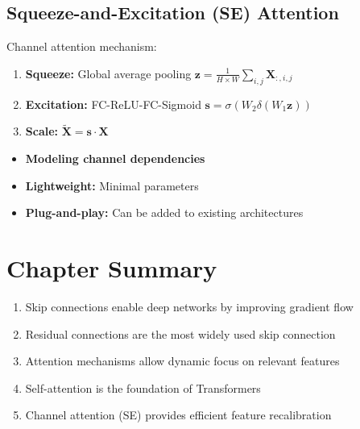 \subsection{Squeeze-and-Excitation (SE) Attention}

Channel attention mechanism:
\begin{enumerate}
    \item \textbf{Squeeze:} Global average pooling $\mathbf{z} = \frac{1}{H\times W}\sum_{i,j}\mathbf{X}_{:,i,j}$
    \item \textbf{Excitation:} FC-ReLU-FC-Sigmoid $\mathbf{s} = \sigma(W_2\delta(W_1\mathbf{z}))$
    \item \textbf{Scale:} $\tilde{\mathbf{X}} = \mathbf{s} \cdot \mathbf{X}$
\end{enumerate}

\begin{properties}[SE Block]
\begin{itemize}
    \item \textbf{Modeling channel dependencies}
    \item \textbf{Lightweight:} Minimal parameters
    \item \textbf{Plug-and-play:} Can be added to existing architectures
\end{itemize}
\end{properties}

\section{Chapter Summary}

\begin{enumerate}
    \item Skip connections enable deep networks by improving gradient flow
    \item Residual connections are the most widely used skip connection
    \item Attention mechanisms allow dynamic focus on relevant features
    \item Self-attention is the foundation of Transformers
    \item Channel attention (SE) provides efficient feature recalibration
\end{enumerate}
